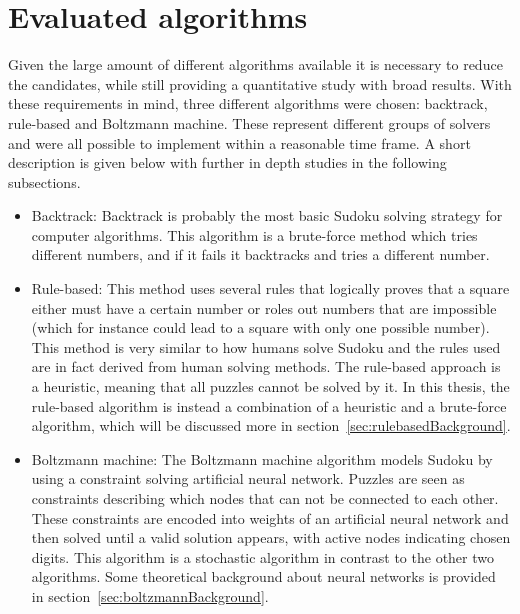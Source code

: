 \documentclass[a4paper,11pt]{kth-mag}
\begin{document}
\section{Evaluated algorithms}
Given the large amount of different algorithms available it is necessary to reduce the candidates, while still providing a quantitative study with broad results.
With these requirements in mind, three different algorithms were chosen: backtrack, rule-based and Boltzmann machine.
These represent different groups of solvers and were all possible to implement within a reasonable time frame.
A short description is given below with further in depth studies in the following subsections.
\begin{itemize}
    \item Backtrack:
    Backtrack is probably the most basic Sudoku solving strategy for computer algorithms.
This algorithm is a brute-force method which tries different numbers, and if it fails it backtracks and tries a different number.
    \item Rule-based:
    This method uses several rules that logically proves that a square either must have a certain number or roles out numbers that are impossible (which for instance could lead to a square with only one possible number).
This method is very similar to how humans solve Sudoku and the rules used are in fact derived from human solving methods.
The rule-based approach is a heuristic, meaning that all puzzles cannot be solved by it. In this thesis, the rule-based algorithm is instead a combination of a heuristic and a brute-force algorithm, which will be discussed more in section~\ref{sec:rulebasedBackground}.
    \item Boltzmann machine:
    The Boltzmann machine algorithm models Sudoku by using a constraint solving artificial neural network.
Puzzles are seen as constraints describing which nodes that can not be connected to each other.
These constraints are encoded into weights of an artificial neural network and then solved until a valid solution appears, with active nodes indicating chosen digits. 
This algorithm is a stochastic algorithm in contrast to the other two algorithms. Some theoretical background about neural networks is provided in section~\ref{sec:boltzmannBackground}.
\end{itemize}

\FloatBarrier
\end{document}
